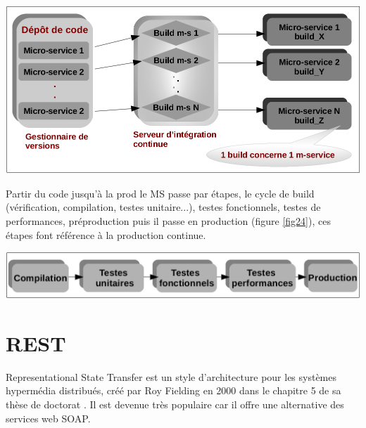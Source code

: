 \documentclass[12pt, a4paper, openany]{report}
\begin{document}
\begin{appendices}
  \begin{center}
    \includegraphics[scale=0.32]{itegra_conti_2_23.png}
    \label{fig23}
  \end{center} 
 
 Partir du code jusqu'à la prod le MS passe par étapes, le cycle de build (vérification, compilation, testes unitaire...), testes fonctionnels, testes de performances, préproduction puis il passe en production (figure \ref{fig24}), ces étapes font référence à la production continue. \\
 
  \begin{center}
    \includegraphics[scale=0.35]{etape_prod_24.png}
    \label{fig24}
  \end{center} 



\chapter{REST}
  Representational State Transfer  est un style d'architecture pour les systèmes hypermédia distribués, créé par Roy Fielding en 2000 dans le chapitre 5 de sa thèse de doctorat \cite{refbibrest} . Il est devenue très populaire car il offre une alternative des services web SOAP.

\end{appendices}
\end{document}
